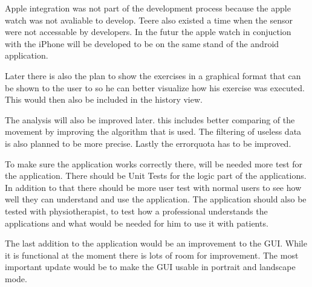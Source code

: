 Apple integration was not part of the development process because the apple watch was not avaliable to develop. Teere also existed a time when the sensor were not accessable by developers. In the futur the apple watch in conjuction with the iPhone will be developed to be on the same stand of the android application.

Later there is also the plan to show the exercises in a graphical format that can be shown to the user to so he can better visualize how his exercise was executed. This would then also be included in the history view.

The analysis will also be improved later. this includes better comparing of the movement by improving the algorithm that is used. The filtering of useless data is also planned to be more precise. Lastly the errorquota has to be improved.

To make sure the application works correctly there, will be needed more test for the application. There should be  Unit Tests for the logic part of the applications. In addition to that there should be more user test with normal users to see how well they can understand and use the application. The application should also be tested with physiotherapist, to test how a professional understands the applications and what would be needed for him to use it with patients.

The last addition to the application would be an improvement to the GUI. While it is functional at the moment there is lots of room for improvement. The most important update would be to make the GUI usable in portrait and landscape mode.

